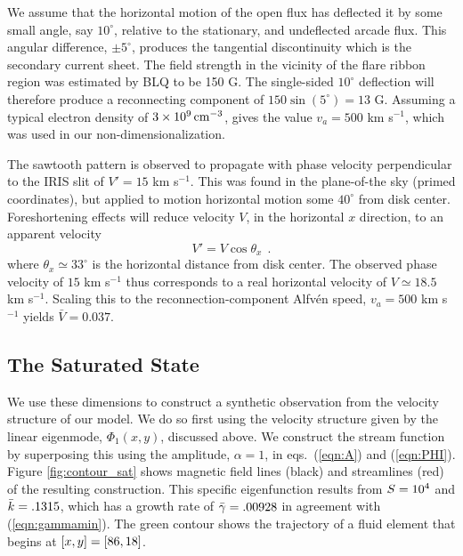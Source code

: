 	We assume that the horizontal motion of the open flux has deflected it by some small angle, say $10^{\circ}$, relative to the stationary, and undeflected arcade flux.  This angular difference, $\pm5^{\circ}$, produces the tangential discontinuity which is the secondary current sheet.  The field strength in the vicinity of the flare ribbon region was estimated by BLQ to be 150 G.  The single-sided  $10^{\circ}$ deflection will therefore produce a reconnecting component of $150\sin(5^{\circ})=13$ G.  Assuming a typical electron density of $3 \times 10^9\,{\rm cm^{-3}}$, gives the value $v_a = 500$ km s$^{-1}$, which was used in our non-dimensionalization.  
	
	The sawtooth pattern is observed to propagate with phase velocity perpendicular to the IRIS slit of $V' = 15$ km s$^{-1}$.
This was found in the plane-of-the sky (primed coordinates), but applied to motion horizontal motion some $40^{\circ}$ from disk center.  Foreshortening effects will reduce velocity $V$, in the horizontal $x$ direction, to an apparent velocity
	\begin{equation}
	\label{eqn:x_scale}
		V' = V\cos\theta_x~~.
	\end{equation}
where $\theta_x\simeq33^{\circ}$ is the horizontal distance from disk center.  The observed phase velocity of $15$ km s$^{-1}$ thus corresponds to a real horizontal velocity of $V \simeq 18.5 $ km s$^{-1}$.  Scaling this to the reconnection-component Alfv\'en speed, $v_a=500$ km s$^{-1}$ yields 
$\bar{V}=0.037$.  

\subsection{The Saturated State}

We use these dimensions to construct a synthetic observation from the velocity structure of our model.  We do so first using the velocity structure given by the linear eigenmode, $\Phi_1(x,y)$, discussed above.  We construct the stream function by superposing this using the amplitude, $\alpha=1$, in eqs.\ (\ref{eqn:A}) and (\ref{eqn:PHI}).  Figure \ref{fig:contour_sat} shows magnetic field lines (black) and streamlines (red) of the resulting construction.  This specific eigenfunction results from $S=10^4$ and $\bar{k}=.1315$, which has a growth rate of $\bar{\gamma} = .00928$ in agreement with (\ref{eqn:gammamin}).  The green contour shows the trajectory of a fluid element that begins at $[x,y]=[86,18]$.
	
